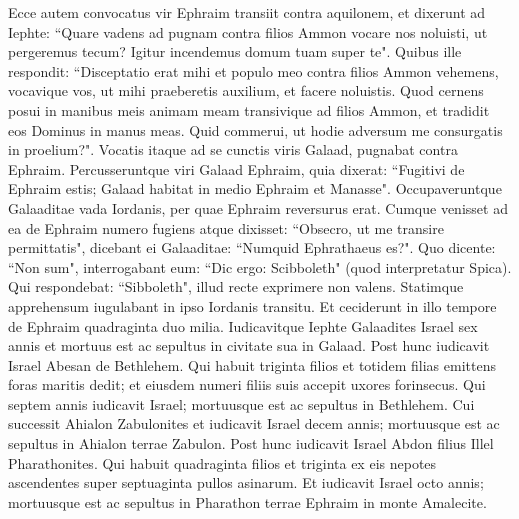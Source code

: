 \begin{biblechapter}  
\verse Ecce autem convocatus vir Ephraim transiit contra aquilonem, et dixerunt ad Iephte: “Quare vadens ad pugnam contra filios Ammon vocare nos noluisti, ut pergeremus tecum? Igitur incendemus domum tuam super te". 
\verse Quibus ille respondit: “Disceptatio erat mihi et populo meo contra filios Ammon vehemens, vocavique vos, ut mihi praeberetis auxilium, et facere noluistis. 
\verse Quod cernens posui in manibus meis animam meam transivique ad filios Ammon, et tradidit eos Dominus in manus meas. Quid commerui, ut hodie adversum me consurgatis in proelium?". 
\verse Vocatis itaque ad se cunctis viris Galaad, pugnabat contra Ephraim. Percusseruntque viri Galaad Ephraim, quia dixerat: “Fugitivi de Ephraim estis; Galaad habitat in medio Ephraim et Manasse". 
\verse Occupaveruntque Galaaditae vada Iordanis, per quae Ephraim reversurus erat. Cumque venisset ad ea de Ephraim numero fugiens atque dixisset: “Obsecro, ut me transire permittatis", dicebant ei Galaaditae: “Numquid Ephrathaeus es?". Quo dicente: “Non sum",  
\verse interrogabant eum: “Dic ergo: Scibboleth" (quod interpretatur Spica). Qui respondebat: “Sibboleth", illud recte exprimere non valens. Statimque apprehensum iugulabant in ipso Iordanis transitu. Et ceciderunt in illo tempore de Ephraim quadraginta duo milia. 
\verse Iudicavitque Iephte Galaadites Israel sex annis et mortuus est ac sepultus in civitate sua in Galaad. 
\verse Post hunc iudicavit Israel Abesan de Bethlehem. 
\verse Qui habuit triginta filios et totidem filias emittens foras maritis dedit; et eiusdem numeri filiis suis accepit uxores forinsecus. Qui septem annis iudicavit Israel; 
\verse mortuusque est ac sepultus in Bethlehem. 
\verse Cui successit Ahialon Zabulonites et iudicavit Israel decem annis; 
\verse mortuusque est ac sepultus in Ahialon terrae Zabulon. 
\verse Post hunc iudicavit Israel Abdon filius Illel Pharathonites. 
\verse Qui habuit quadraginta filios et triginta ex eis nepotes ascendentes super septuaginta pullos asinarum. Et iudicavit Israel octo annis; 
\verse mortuusque est ac sepultus in Pharathon terrae Ephraim in monte Amalecite. 
\end{biblechapter}

